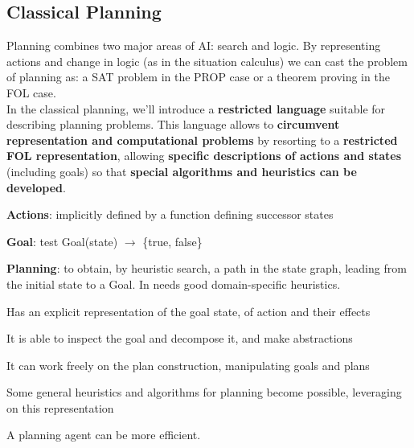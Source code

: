 \documentclass[10pt]{report}
\begin{document}
\subsection{Classical Planning}
Planning combines two major areas of AI: search and logic. By representing actions and change in logic (as in the situation calculus) we can cast the problem of planning as: a SAT problem in the PROP case or a theorem proving in the FOL case.\\
In the classical planning, we'll introduce a \textbf{restricted language} suitable for describing planning problems. This language allows to \textbf{circumvent representation and computational problems} by resorting to a \textbf{restricted FOL representation}, allowing \textbf{specific descriptions of actions and states} (including goals) so that \textbf{special algorithms and heuristics can be developed}.
\begin{multicols}{2}
\begin{list}{}{\textbf{Problem Solving Agent}}
	\item \textbf{Actions}: implicitly defined by a function defining successor states
	\item \textbf{Goal}: test Goal(state) $\rightarrow$ \{true, false\}
	\item \textbf{Planning}: to obtain, by heuristic search, a path in the state graph, leading from the initial state to a Goal. In needs good domain-specific heuristics.
\end{list}
\columnbreak
\begin{list}{}{\textbf{Planning Agent}}
	\item Has an explicit representation of the goal state, of action and their effects
	\item It is able to inspect the goal and decompose it, and make abstractions
	\item It can work freely on the plan construction, manipulating goals and plans
	\item Some general heuristics and algorithms for planning become possible, leveraging on this representation
\end{list}
A planning agent can be more efficient.
\end{multicols}
\end{document}
